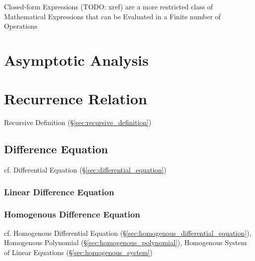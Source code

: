 Closed-form Expressions (TODO: xref) are a more restricted class of Mathematical
Expressions that can be Evaluated in a Finite number of Operations



\section{Asymptotic Analysis}\label{sec:asymptotic_analysis}




\section{Recurrence Relation}\label{sec:recurrence_relation}

Recursive Definition (\S\ref{sec:recursive_definition})



\subsection{Difference Equation}\label{sec:difference_equation}

\fist cf. Differential Equation (\S\ref{sec:differential_equation})



\subsubsection{Linear Difference Equation}\label{sec:linear_difference_equation}

\subsubsection{Homogenous Difference Equation}
\label{sec:homogenous_difference_equation}

cf. Homogenous Differential Equation
(\S\ref{sec:homogenous_differential_equation}), Homogenous Polynomial
(\S\ref{sec:homogenous_polynomial}), Homogenous System of Linear Equations
(\S\ref{sec:homogenous_system})



